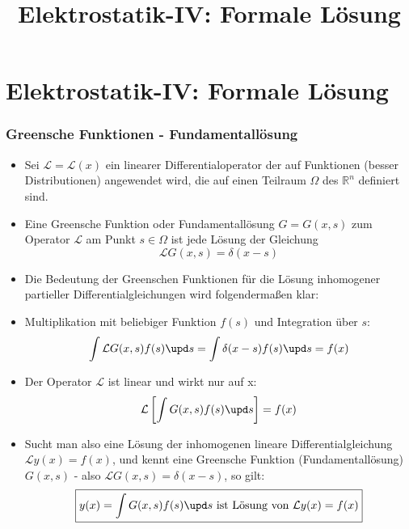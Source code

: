 

\title[TET: Elektrostatik-IV: Formale Lösung]{Elektrostatik-IV: Formale Lösung}


% 
% 

\maketitle

% 
% 
\section{Elektrostatik-IV: Formale Lösung}

\begin{frame}

  \frametitle{Greensche Funktionen - Fundamentallösung}

  \begin{itemize}[<+->]
  \item Sei $\mathcal{L}=\mathcal{L}(x)$ ein \alert{linearer Differentialoperator} der auf Funktionen (besser Distributionen) angewendet wird, die auf einen Teilraum $\Omega$ des $\mathbb{R}^n$ definiert sind.
  \item  Eine \alert{Greensche Funktion} oder \alert{Fundamentallösung} $G=G(x,s)$ zum Operator $\mathcal{L}$ am Punkt $s\in \Omega$ ist \alert{jede Lösung} der Gleichung
    $$
    \mathcal{L}G(x,s) = \delta(x-s)
    $$
  \item Die Bedeutung der Greenschen Funktionen für die Lösung inhomogener partieller Differentialgleichungen wird folgendermaßen klar:
  \item Multiplikation mit beliebiger Funktion $f(s)$ und Integration über $s$:
    $$
    \int \mathcal{L}G(x,s)f(s) \upd s = \int \delta(x-s) f(s) \upd s = f(x)
    $$
  \item Der Operator $\mathcal{L}$ ist linear und wirkt nur auf x:
    $$
    \mathcal{L}\left[ \int G(x,s)f(s) \upd s  \right] = f(x)
    $$
  \item Sucht man also eine Lösung der inhomogenen lineare Differentialgleichung $\mathcal{L} y(x) = f(x)$, und kennt eine Greensche Funktion (Fundamentallösung) $G(x,s)$ - also $\mathcal{L}G(x,s)=\delta(x-s)$, so gilt:
    $$
    \boxed{y(x) = \int G(x,s)f(s)\upd s \text{ ist Lösung von } \mathcal{L} y(x) = f(x)}
    $$
  \end{itemize}
  
\end{frame}


